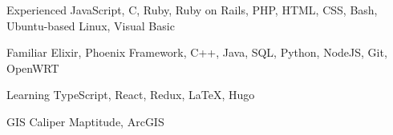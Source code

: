 

\begin{cvskills}

  \cvskill
    {Experienced} %
    {JavaScript, C, Ruby, Ruby on Rails, PHP, HTML, CSS, Bash, Ubuntu-based Linux, Visual Basic} %

  \cvskill
    {Familiar} %
    {Elixir, Phoenix Framework, C++, Java, SQL, Python, NodeJS, Git, OpenWRT} %
    
  \cvskill
    {Learning} %
    {TypeScript, React, Redux, \LaTeX, Hugo} %
    
  \cvskill
    {GIS} %
    {Caliper Maptitude, ArcGIS} %


\end{cvskills}
